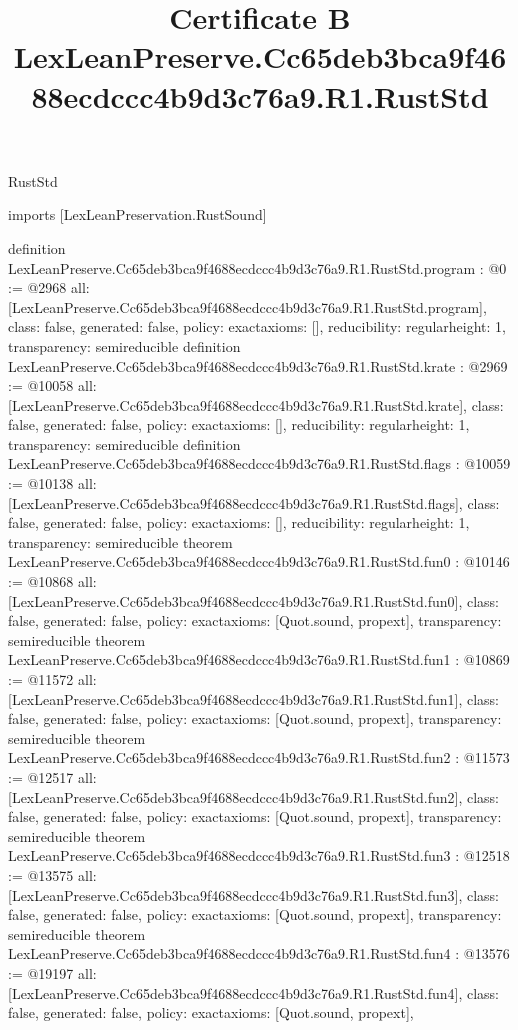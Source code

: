 \begin{lexlean}{RustStd}
\title{Certificate B LexLeanPreserve.Cc65deb3bca9f4688ecdccc4b9d3c76a9.R1.RustStd}
\begin{coremodule}
imports [LexLeanPreservation.RustSound]

definition LexLeanPreserve.Cc65deb3bca9f4688ecdccc4b9d3c76a9.R1.RustStd.program : @0 := @2968 {
  all: [LexLeanPreserve.Cc65deb3bca9f4688ecdccc4b9d3c76a9.R1.RustStd.program],
  class: false,
  generated: false,
  policy: exact{axioms: []},
  reducibility: regular{height: 1},
  transparency: semireducible
}
definition LexLeanPreserve.Cc65deb3bca9f4688ecdccc4b9d3c76a9.R1.RustStd.krate : @2969 := @10058 {
  all: [LexLeanPreserve.Cc65deb3bca9f4688ecdccc4b9d3c76a9.R1.RustStd.krate],
  class: false,
  generated: false,
  policy: exact{axioms: []},
  reducibility: regular{height: 1},
  transparency: semireducible
}
definition LexLeanPreserve.Cc65deb3bca9f4688ecdccc4b9d3c76a9.R1.RustStd.flags : @10059 := @10138 {
  all: [LexLeanPreserve.Cc65deb3bca9f4688ecdccc4b9d3c76a9.R1.RustStd.flags],
  class: false,
  generated: false,
  policy: exact{axioms: []},
  reducibility: regular{height: 1},
  transparency: semireducible
}
theorem LexLeanPreserve.Cc65deb3bca9f4688ecdccc4b9d3c76a9.R1.RustStd.fun0 : @10146 := @10868 {
  all: [LexLeanPreserve.Cc65deb3bca9f4688ecdccc4b9d3c76a9.R1.RustStd.fun0],
  class: false,
  generated: false,
  policy: exact{axioms: [Quot.sound, propext]},
  transparency: semireducible
}
theorem LexLeanPreserve.Cc65deb3bca9f4688ecdccc4b9d3c76a9.R1.RustStd.fun1 : @10869 := @11572 {
  all: [LexLeanPreserve.Cc65deb3bca9f4688ecdccc4b9d3c76a9.R1.RustStd.fun1],
  class: false,
  generated: false,
  policy: exact{axioms: [Quot.sound, propext]},
  transparency: semireducible
}
theorem LexLeanPreserve.Cc65deb3bca9f4688ecdccc4b9d3c76a9.R1.RustStd.fun2 : @11573 := @12517 {
  all: [LexLeanPreserve.Cc65deb3bca9f4688ecdccc4b9d3c76a9.R1.RustStd.fun2],
  class: false,
  generated: false,
  policy: exact{axioms: [Quot.sound, propext]},
  transparency: semireducible
}
theorem LexLeanPreserve.Cc65deb3bca9f4688ecdccc4b9d3c76a9.R1.RustStd.fun3 : @12518 := @13575 {
  all: [LexLeanPreserve.Cc65deb3bca9f4688ecdccc4b9d3c76a9.R1.RustStd.fun3],
  class: false,
  generated: false,
  policy: exact{axioms: [Quot.sound, propext]},
  transparency: semireducible
}
theorem LexLeanPreserve.Cc65deb3bca9f4688ecdccc4b9d3c76a9.R1.RustStd.fun4 : @13576 := @19197 {
  all: [LexLeanPreserve.Cc65deb3bca9f4688ecdccc4b9d3c76a9.R1.RustStd.fun4],
  class: false,
  generated: false,
  policy: exact{axioms: [Quot.sound, propext]},
}
\end{coremodule}
\end{lexlean}
